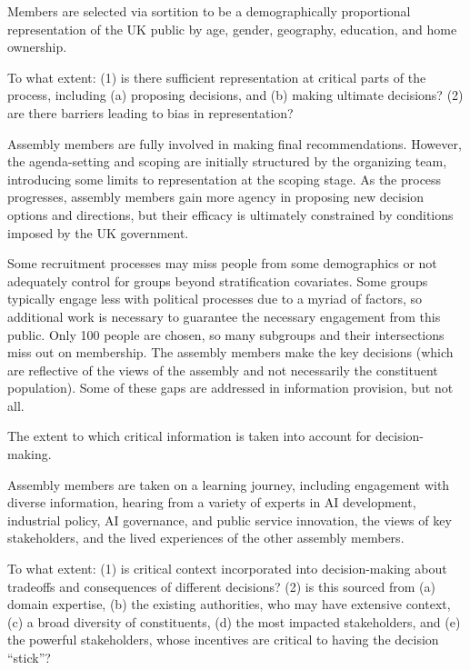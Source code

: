     Members are selected via sortition to be a demographically proportional representation of the UK public by age, gender, geography, education, and home ownership.

    \begin{evaluate}[grey]
        To what extent: (1) is there sufficient representation at critical parts of the process, including (a) proposing decisions, and (b) making ultimate decisions? (2) are there barriers leading to bias in representation?
    \end{evaluate}

    Assembly members are fully involved in making final recommendations. However, the agenda-setting and scoping are initially structured by the organizing team, introducing some limits to representation at the scoping stage. As the process progresses, assembly members gain more agency in proposing new decision options and directions, but their efficacy is ultimately constrained by conditions imposed by the UK government.

    Some recruitment processes may miss people from some demographics or not adequately control for groups beyond stratification covariates. Some groups typically engage less with political processes due to a myriad of factors, so additional work is necessary to guarantee the necessary engagement from this public. Only 100 people are chosen, so many subgroups and their intersections miss out on membership. The assembly members make the key decisions (which are reflective of the views of the assembly and not necessarily the constituent population). Some of these gaps are addressed in information provision, but not all.
    

    \begin{describe}[grey]
        The extent to which critical information is taken into account for decision-making.
    \end{describe}

    Assembly members are taken on a learning journey, including engagement with diverse information, hearing from a variety of experts in AI development, industrial policy, AI governance, and public service innovation, the views of key stakeholders, and the lived experiences of the other assembly members. 
    
    \begin{evaluate}[grey]
        To what extent: (1) is critical context incorporated into decision-making about tradeoffs and consequences of different decisions? (2) is this sourced from (a) domain expertise, (b) the existing authorities, who may have extensive context, (c) a broad diversity of constituents, (d) the most impacted stakeholders, and (e) the powerful stakeholders, whose incentives are critical to having the decision ``stick''?
    \end{evaluate}
    

